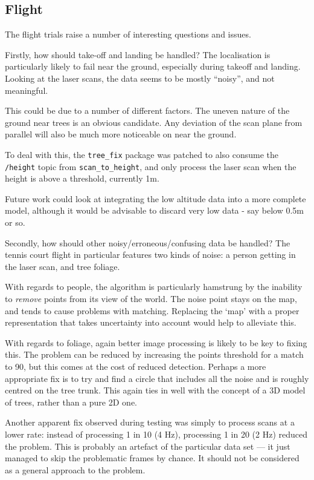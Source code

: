 \documentclass[12pt,oneside,a4paper]{book}
\begin{document}
\subsection{Flight}
\label{sec:flight}

The flight trials raise a number of interesting questions and issues.

Firstly, how should take-off and landing be handled? The localisation
is particularly likely to fail near the ground, especially during
takeoff and landing. Looking at the laser scans, the data seems to be
mostly ``noisy'', and not meaningful.

This could be due to a number of different factors. The uneven nature
of the ground near trees is an obvious candidate. Any deviation of the
scan plane from parallel will also be much more noticeable on near the
ground.

To deal with this, the \texttt{tree\_fix} package was patched to also
consume the \texttt{/height} topic from \texttt{scan\_to\_height}, and
only process the laser scan when the height is above a threshold,
currently 1m.

Future work could look at integrating the low altitude data into a
more complete model, although it would be advisable to discard very
low data - say below 0.5m or so.

Secondly, how should other noisy/erroneous/confusing data be handled? The tennis court
flight in particular features two kinds of noise: a person getting in
the laser scan, and tree foliage.

With regards to people, the algorithm is particularly hamstrung by the
inability to \emph{remove} points from its view of the world. The
noise point stays on the map, and tends to cause problems with
matching. Replacing the `map' with a proper representation that takes
uncertainty into account would help to alleviate this.

With regards to foliage, again better image processing is likely to
be key to fixing this. The problem can be reduced by increasing the
points threshold for a match to 90, but this comes at the cost of
reduced detection. Perhaps a more appropriate fix is to try and find a
circle that includes all the noise and is roughly centred on the tree
trunk. This again ties in well with the concept of a 3D model of trees,
rather than a pure 2D one.

Another apparent fix observed during testing was simply to process
scans at a lower rate: instead of processing 1 in 10 (4 Hz),
processing 1 in 20 (2 Hz) reduced the problem. This is probably an
artefact of the particular data set --- it just managed to skip the
problematic frames by chance. It should not be considered as a
general approach to the problem.
\end{document}
